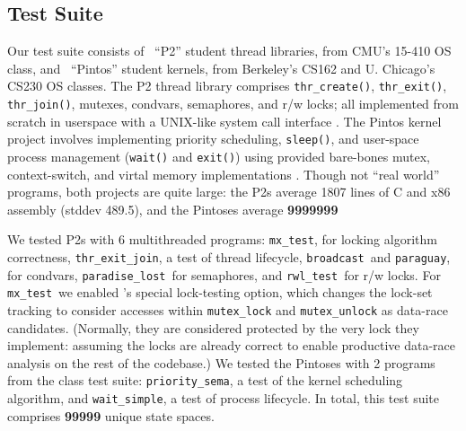 \subsection{Test Suite}
Our test suite consists of \numthrlibs~``P2'' student thread libraries, from CMU's 15-410 OS class,
and \numpintoses~``Pintos'' student kernels, from Berkeley's CS162 and U. Chicago's CS230 OS classes.
%
The P2 thread library comprises \texttt{thr\_create()}, \texttt{thr\_exit()}, \texttt{thr\_join()}, mutexes, condvars, semaphores, and r/w locks;
all implemented from scratch in userspace with a UNIX-like system call interface \cite{kspec,thrlib}.
%
The Pintos kernel project
involves implementing priority scheduling, \texttt{sleep()}, and user-space process management (\texttt{wait()} and \texttt{exit()})
using provided bare-bones mutex, context-switch, and virtal memory implementations
\cite{pintos}.
Though not ``real world'' programs, both projects are quite large: %
the P2s average 1807 lines of C and x86 assembly (stddev 489.5),
and the Pintoses average {\bf 9999999} %

\newcommand\mxtest{\texttt{mx\_test}}
\newcommand\tej{\texttt{thr\_exit\_join}}
\newcommand\bct{\texttt{broadcast}}
\newcommand\paraguay{\texttt{paraguay}}
\newcommand\paradise{\texttt{paradise\_lost}}
\newcommand\rwl{\texttt{rwl\_test}}
We tested P2s with 6 multithreaded programs:
\mxtest, for locking algorithm correctness, \tej, a test of thread lifecycle, \bct~and \paraguay, for condvars, \paradise~for semaphores, and \rwl~for r/w locks.
For \mxtest~we enabled \landslide's special lock-testing option, which changes the lock-set tracking to consider accesses within {\tt mutex\_lock} and {\tt mutex\_unlock} as data-race candidates.
(Normally, they are considered protected by the very lock they implement: assuming the locks are already correct to enable productive data-race analysis on the rest of the codebase.)
\newcommand\prisema{\texttt{priority\_sema}}
\newcommand\waitsimple{\texttt{wait\_simple}}
We tested the Pintoses with 2 programs from the class test suite: \prisema, a test of the kernel scheduling algorithm, and \waitsimple, a test of process lifecycle. %
In total, this test suite comprises {\large \bf 99999} %
unique state spaces.

